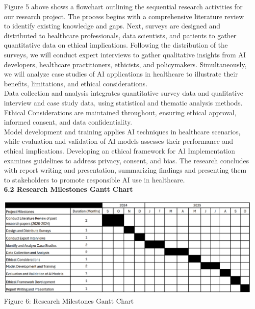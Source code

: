 \documentclass[a4paper, 12pt]{article}
\begin{document}
Figure 5 above shows a flowchart outlining the sequential research activities for our research project. The process begins with a comprehensive literature review to identify existing knowledge and gaps. Next, surveys are designed and distributed to healthcare professionals, data scientists, and patients to gather quantitative data on ethical implications. Following the distribution of the surveys, we will conduct expert interviews to gather qualitative insights from AI developers, healthcare practitioners, ethicists, and policymakers. Simultaneously, we will analyze case studies of AI applications in healthcare to illustrate their benefits, limitations, and ethical considerations.\\

Data collection and analysis integrates quantitative survey data and qualitative interview and case study data, using statistical and thematic analysis methods. Ethical Considerations are maintained throughout, ensuring ethical approval, informed consent, and data confidentiality.\\

Model development and training applies AI techniques in healthcare scenarios, while evaluation and validation of AI models assesses their performance and ethical implications. Developing an ethical framework for AI Implementation examines guidelines to address privacy, consent, and bias. The research concludes with report writing and presentation, summarizing findings and presenting them to stakeholders to promote responsible AI use in healthcare.\\

\textbf{6.2 \hspace{5mm} Research Milestones Gantt Chart}
\begin{center}
\includegraphics[scale=0.48]{GanttChart Research Milestones.png}\\
\small Figure 6: Research Milestones Gantt Chart \normalsize
\end{center}
\end{document}
